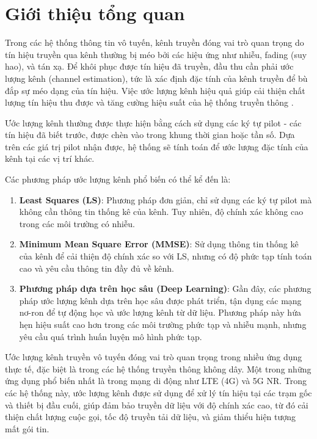\section{Giới thiệu tổng quan}

Trong các hệ thống thông tin vô tuyến, kênh truyền đóng vai trò quan trọng do tín hiệu truyền qua kênh thường bị méo bởi các hiệu ứng như nhiễu, fading (suy hao), và tán xạ. 
Để khôi phục được tín hiệu đã truyền, đầu thu cần phải ước lượng kênh (channel estimation), tức là xác định đặc tính của kênh truyền để bù đắp sự méo dạng của tín hiệu. 
Việc ước lượng kênh hiệu quả giúp cải thiện chất lượng tín hiệu thu được và tăng cường hiệu suất của hệ thống truyền thông \cite{Rappaport2024}.

Ước lượng kênh thường được thực hiện bằng cách sử dụng các ký tự pilot - các tín hiệu đã biết trước, 
được chèn vào trong khung thời gian hoặc tần số. 
Dựa trên các giá trị pilot nhận được, hệ thống sẽ tính toán để ước lượng đặc tính của kênh tại các vị trí khác.

Các phương pháp ước lượng kênh phổ biến có thể kể đến là:

\begin{enumerate}
    \item \textbf{Least Squares (LS)}: Phương pháp đơn giản, chỉ sử dụng các ký tự pilot mà không cần thông tin thống kê của kênh. Tuy nhiên, độ chính xác không cao trong các môi trường có nhiễu.

    \item \textbf{Minimum Mean Square Error (MMSE)}: Sử dụng thông tin thống kê của kênh để cải thiện độ chính xác so với LS, nhưng có độ phức tạp tính toán cao và yêu cầu thông tin đầy đủ về kênh.

    \item \textbf{Phương pháp dựa trên học sâu (Deep Learning)}: Gần đây, các phương pháp ước lượng kênh dựa trên học sâu được phát triển, tận dụng các mạng nơ-ron để tự động học và ước lượng kênh từ dữ liệu. 
    Phương pháp này hứa hẹn hiệu suất cao hơn trong các môi trường phức tạp và nhiễu mạnh, nhưng yêu cầu quá trình huấn luyện mô hình phức tạp.
\end{enumerate}

Ước lượng kênh truyền vô tuyến đóng vai trò quan trọng trong nhiều ứng dụng thực tế, đặc biệt là trong các hệ thống truyền thông không dây. Một trong những ứng dụng phổ biến nhất là trong mạng di động như LTE (4G) và 5G NR. Trong các hệ thống này, ước lượng kênh được sử dụng để xử lý tín hiệu tại các trạm gốc và thiết bị đầu cuối, giúp đảm bảo truyền dữ liệu với độ chính xác cao, từ đó cải thiện chất lượng cuộc gọi, tốc độ truyền tải dữ liệu, và giảm thiểu hiện tượng mất gói tin.

